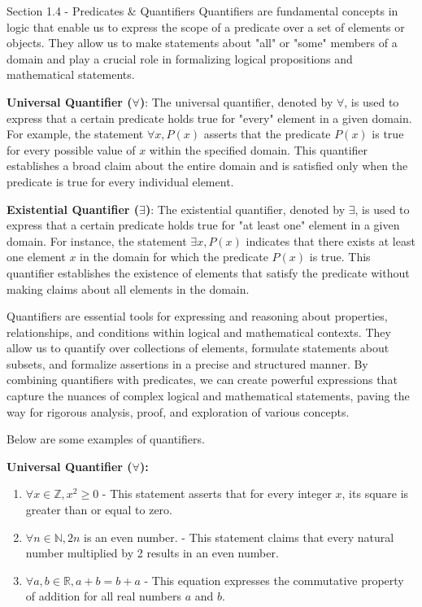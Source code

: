\begin{notes}{Section 1.4 - Predicates \& Quantifiers}
    Quantifiers are fundamental concepts in logic that enable us to express the scope of a predicate over a set of elements or objects. They allow us to make statements about "all" or "some" members of a domain and play a crucial role in formalizing 
    logical propositions and mathematical statements.

    \textbf{Universal Quantifier (\(\forall\))}: The universal quantifier, denoted by \(\forall\), is used to express that a certain predicate holds true for "every" element in a given domain. For example, the statement \(\forall x, P(x)\) asserts that 
    the predicate \(P(x)\) is true for every possible value of \(x\) within the specified domain. This quantifier establishes a broad claim about the entire domain and is satisfied only when the predicate is true for every individual element.

    \textbf{Existential Quantifier (\(\exists\))}: The existential quantifier, denoted by \(\exists\), is used to express that a certain predicate holds true for "at least one" element in a given domain. For instance, the statement \(\exists x, P(x)\) 
    indicates that there exists at least one element \(x\) in the domain for which the predicate \(P(x)\) is true. This quantifier establishes the existence of elements that satisfy the predicate without making claims about all elements in the domain.

    Quantifiers are essential tools for expressing and reasoning about properties, relationships, and conditions within logical and mathematical contexts. They allow us to quantify over collections of elements, formulate statements about subsets, 
    and formalize assertions in a precise and structured manner. By combining quantifiers with predicates, we can create powerful expressions that capture the nuances of complex logical and mathematical statements, paving the way for rigorous analysis, 
    proof, and exploration of various concepts.

    \begin{Highlight}
        Below are some examples of quantifiers.

        \textbf{Universal Quantifier (\(\forall\)):}
        \begin{enumerate}
            \item \(\forall x \in \mathbb{Z}, x^2 \geq 0\) - This statement asserts that for every integer \(x\), its square is greater than or equal to zero.
            \item \(\forall n \in \mathbb{N}, 2n\) is an even number. - This statement claims that every natural number multiplied by 2 results in an even number.
            \item \(\forall a, b \in \mathbb{R}, a + b = b + a\) - This equation expresses the commutative property of addition for all real numbers \(a\) and \(b\).
        \end{enumerate}
        

\end{Highlight}
\end{notes}
